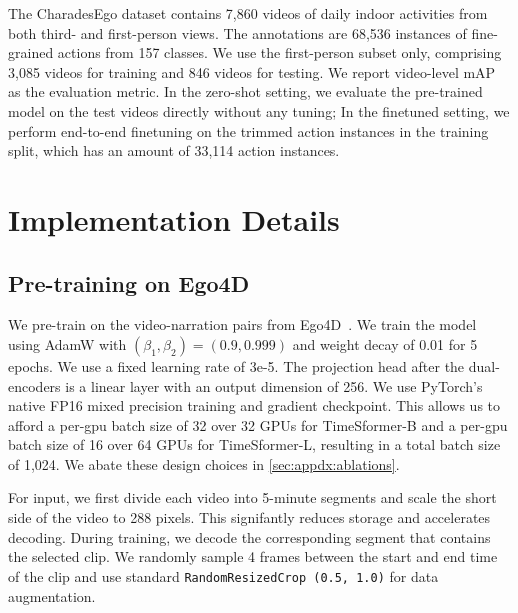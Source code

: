 \documentclass[10pt,twocolumn,letterpaper]{article}
\newcommand{\myparagraph}[1]{\vspace{0pt}\noindent{\bf #1}}
\begin{document}
\myparagraph{CharadesEgo.}
The CharadesEgo dataset contains 7,860 videos of daily indoor activities from both third- and first-person views.
The annotations are 68,536 instances of fine-grained actions from 157 classes.
We use the first-person subset only, comprising 3,085 videos for training and 846 videos for testing.
We report video-level mAP as the evaluation metric.
In the zero-shot setting, we evaluate the pre-trained model on the test videos directly without any tuning;
In the finetuned setting, we perform end-to-end finetuning on the trimmed action instances in the training split, which has an amount of 33,114 action instances.


\section{Implementation Details}
\label{sec:appdx:impl}

\subsection{Pre-training on Ego4D}
\label{sec:appdx:impl:pretrain_ego4d}
We pre-train on the video-narration pairs from Ego4D~\cite{grauman2022ego4d}.
We train the model using AdamW with $(\beta_1,\beta_2)=(0.9, 0.999)$ and weight decay of 0.01 for 5 epochs.
We use a fixed learning rate of 3e-5.
The projection head after the dual-encoders is a linear layer with an output dimension of 256.
We use PyTorch's native FP16 mixed precision training and gradient checkpoint.
This allows us to afford a per-gpu batch size of 32 over 32 GPUs for TimeSformer-B and a per-gpu batch size of 16 over 64 GPUs for TimeSformer-L, resulting in a total batch size of 1,024.
We abate these design choices in \cref{sec:appdx:ablations}.

For input, we first divide each video into 5-minute segments and scale the short side of the video to 288 pixels.
This signifantly reduces storage and accelerates decoding.
During training, we decode the corresponding segment that contains the selected clip.
We randomly sample 4 frames between the start and end time of the clip and use standard \texttt{RandomResizedCrop (0.5, 1.0)} for data augmentation.
\end{document}
